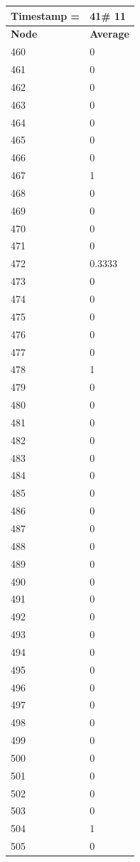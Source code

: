 \begin{tabular}{|l||l|}
\hline
\textbf{Timestamp =} & \textbf{41}\# 11\\\hline
	\textbf{Node} & \textbf{Average} \\ \hline
\hline
	460 & 0 \\ \hline
	461 & 0 \\ \hline
	462 & 0 \\ \hline
	463 & 0 \\ \hline
	464 & 0 \\ \hline
	465 & 0 \\ \hline
	466 & 0 \\ \hline
	467 & 1 \\ \hline
	468 & 0 \\ \hline
	469 & 0 \\ \hline
	470 & 0 \\ \hline
	471 & 0 \\ \hline
	472 & 0.3333 \\ \hline
	473 & 0 \\ \hline
	474 & 0 \\ \hline
	475 & 0 \\ \hline
	476 & 0 \\ \hline
	477 & 0 \\ \hline
	478 & 1 \\ \hline
	479 & 0 \\ \hline
	480 & 0 \\ \hline
	481 & 0 \\ \hline
	482 & 0 \\ \hline
	483 & 0 \\ \hline
	484 & 0 \\ \hline
	485 & 0 \\ \hline
	486 & 0 \\ \hline
	487 & 0 \\ \hline
	488 & 0 \\ \hline
	489 & 0 \\ \hline
	490 & 0 \\ \hline
	491 & 0 \\ \hline
	492 & 0 \\ \hline
	493 & 0 \\ \hline
	494 & 0 \\ \hline
	495 & 0 \\ \hline
	496 & 0 \\ \hline
	497 & 0 \\ \hline
	498 & 0 \\ \hline
	499 & 0 \\ \hline
	500 & 0 \\ \hline
	501 & 0 \\ \hline
	502 & 0 \\ \hline
	503 & 0 \\ \hline
	504 & 1 \\ \hline
	505 & 0 \\ \hline
\end{tabular}
